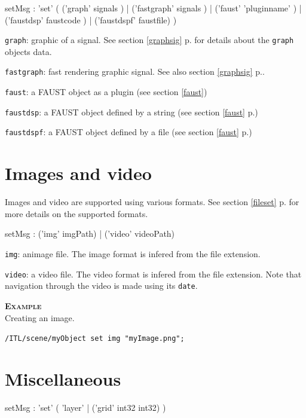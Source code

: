 \documentclass[a4paper,twoside]{report}
\newcommand{\sublevel}[1]	{\section{#1}}
\newcommand{\fullref}[1]	{\ref{#1} p.\pageref{#1}}
\newcommand{\OSC}[1]		{\texttt{#1}}
\newcommand{\example}		{\textbf{\hspace{-1.5cm}\textbf{\textsc{Example }}}}
\let\olditemize\itemize
\let\oldenditemize\enditemize
\renewenvironment{itemize} 	{\olditemize \setlength{\itemsep}{1mm}}{\oldenditemize}
\newcommand{\sample}	[1]			{\vspace{-2mm}\begin{center}\colorbox{mygrey}{
								\begin{minipage}[t]{0.9\columnwidth} 
								{\small \texttt{#1}}
								\end{minipage}}\end{center}}
\begin{document}
\begin{rail}
setMsg : 'set' (
	('graph' signals ) |
	('fastgraph' signals ) |
	('faust' 'pluginname' ) |
	('faustdsp' faustcode ) |
	('faustdspf' faustfile)
)
\end{rail}

\begin{itemize}
\item \OSC{graph}: graphic of a signal. See section \fullref{graphsig} for details about the \OSC{graph} objects data.
\item \OSC{fastgraph}: fast rendering graphic signal. See also section \fullref{graphsig}.
\item \OSC{faust}: a FAUST object as a plugin (see section \ref{faust})
\item \OSC{faustdsp}: a FAUST object defined by a string (see section \fullref{faust})
\item \OSC{faustdspf}: a FAUST object defined by a file (see section \fullref{faust})
\end{itemize}


\sublevel{Images and video}
\label{imgscore}

Images and video are supported using various formats. See section \fullref{fileset} for more details on the supported formats.

\begin{rail}
setMsg : 
	('img' imgPath) |
	('video' videoPath)
\end{rail}

\begin{itemize}
\item \OSC{img}: animage file. The image format is infered from the file extension.
\item \OSC{video}: a video file. The video format is infered from the file extension. Note that navigation through the video is made using its \OSC{date}.
\end{itemize}

\example \\
Creating an image.
\sample{/ITL/scene/myObject set img "myImage.png";}


\sublevel{Miscellaneous}
\label{miscscore}

\begin{rail}
setMsg : 'set' (
	'layer'  |
	('grid' int32 int32)
)
\end{rail}
\end{document}
